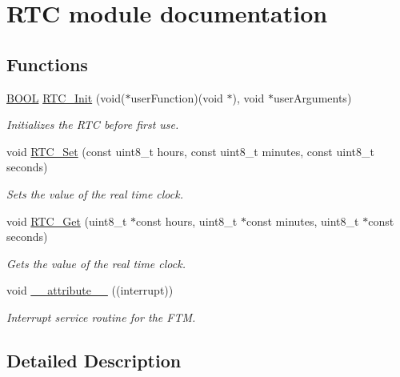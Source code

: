 \hypertarget{group___r_t_c__module}{}\section{R\+T\+C module documentation}
\label{group___r_t_c__module}
\subsection*{Functions}
\begin{DoxyCompactItemize}
\item 
\hyperlink{types_8h_a3e5b8192e7d9ffaf3542f1210aec18dd}{B\+O\+O\+L} \hyperlink{group___r_t_c__module_ga0faa546897ba438dfbd6efbfe6036a67}{R\+T\+C\+\_\+\+Init} (void($\ast$user\+Function)(void $\ast$), void $\ast$user\+Arguments)
\begin{DoxyCompactList}\small\item\em Initializes the R\+T\+C before first use. \end{DoxyCompactList}\item 
void \hyperlink{group___r_t_c__module_gacbe916e4fad6bfc2ffcde604fa6afb52}{R\+T\+C\+\_\+\+Set} (const uint8\+\_\+t hours, const uint8\+\_\+t minutes, const uint8\+\_\+t seconds)
\begin{DoxyCompactList}\small\item\em Sets the value of the real time clock. \end{DoxyCompactList}\item 
void \hyperlink{group___r_t_c__module_ga46e1f15e3b27e2de58d7f213a3bc865d}{R\+T\+C\+\_\+\+Get} (uint8\+\_\+t $\ast$const hours, uint8\+\_\+t $\ast$const minutes, uint8\+\_\+t $\ast$const seconds)
\begin{DoxyCompactList}\small\item\em Gets the value of the real time clock. \end{DoxyCompactList}\item 
void \hyperlink{group___r_t_c__module_ga445500277ba0e363873b34cffc015745}{\+\_\+\+\_\+attribute\+\_\+\+\_\+} ((interrupt))
\begin{DoxyCompactList}\small\item\em Interrupt service routine for the F\+T\+M. \end{DoxyCompactList}\end{DoxyCompactItemize}


\subsection{Detailed Description}


